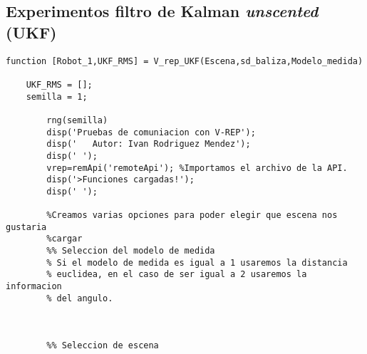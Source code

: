 \subsection{Experimentos filtro de Kalman \textit{unscented} (UKF)}
\begin{lstlisting}[frame=single]
function [Robot_1,UKF_RMS] = V_rep_UKF(Escena,sd_baliza,Modelo_medida)
    
    UKF_RMS = [];
    semilla = 1;
    
        rng(semilla)
        disp('Pruebas de comuniacion con V-REP');
        disp('   Autor: Ivan Rodriguez Mendez');
        disp(' ');
        vrep=remApi('remoteApi'); %Importamos el archivo de la API.
        disp('>Funciones cargadas!');
        disp(' ');
        
        %Creamos varias opciones para poder elegir que escena nos gustaria
        %cargar
        %% Seleccion del modelo de medida
        % Si el modelo de medida es igual a 1 usaremos la distancia
        % euclidea, en el caso de ser igual a 2 usaremos la informacion
        % del angulo.
        
        
        
        %% Seleccion de escena
       
        
         

\end{lstlisting}
